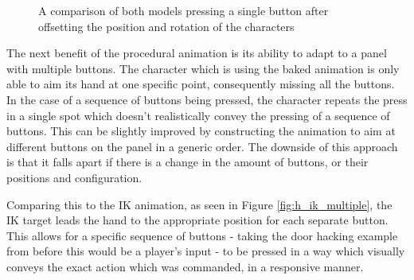 \begin{figure}[h!]
\begin{subfigure}{0.4\textwidth}
        \label{fig:h_ik_offset}
    \end{subfigure}
    \caption{A comparison of both models pressing a single button after
    offsetting the position and rotation of the characters}
    \label{fig:h_offset}
\end{figure}

The next benefit of the procedural animation is its ability to adapt to a panel
with multiple buttons. The character which is using the baked animation is only
able to aim its hand at one specific point, consequently missing all the
buttons. In the case of a sequence of buttons being pressed, the character
repeats the press in a single spot which doesn't realistically convey the
pressing of a sequence of buttons. This can be slightly improved by constructing
the animation to aim at different buttons on the panel in a generic order. The
downside of this approach is that it falls apart if there is a change in the
amount of buttons, or their positions and configuration. 

Comparing this to the IK animation, as seen in Figure \ref{fig:h_ik_multiple},
the IK target leads the hand to the appropriate position for each separate
button. This allows for a specific sequence of buttons - taking the door hacking
example from before this would be a player's input - to be pressed in a way
which visually conveys the exact action which was commanded, in a responsive
manner.

